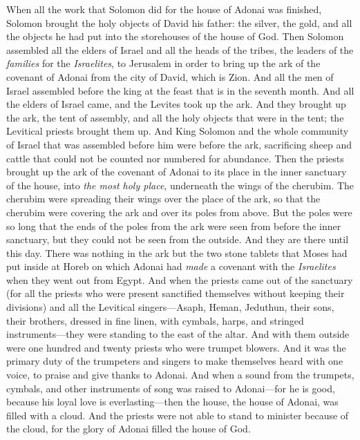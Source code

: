 \begin{biblechapter} %
 When all the work that Solomon did for the house of Adonai was finished, Solomon brought the holy objects of David his father: the silver, the gold, and all the objects he had put into the storehouses of the house of God.
\verse Then Solomon assembled all the elders of Israel and all the heads of the tribes, the leaders of the \textit{families} for the \textit{Israelites}, to Jerusalem in order to bring up the ark of the covenant of Adonai from the city of David, which is Zion.
\verse And all the men of Israel assembled before the king at the feast that is in the seventh month.
\verse And all the elders of Israel came, and the Levites took up the ark.
\verse And they brought up the ark, the tent of assembly, and all the holy objects that were in the tent; the Levitical priests brought them up.
\verse And King Solomon and the whole community of Israel that was assembled before him were before the ark, sacrificing sheep and cattle that could not be counted nor numbered for abundance.
\verse Then the priests brought up the ark of the covenant of Adonai to its place in the inner sanctuary of the house, into \textit{the most holy place}, underneath the wings of the cherubim.
\verse The cherubim were spreading their wings over the place of the ark, so that the cherubim were covering the ark and over its poles from above.
\verse But the poles were so long that the ends of the poles from the ark were seen from before the inner sanctuary, but they could not be seen from the outside. And they are there until this day.
\verse There was nothing in the ark but the two stone tablets that Moses had put inside at Horeb on which Adonai had \textit{made} a covenant with the \textit{Israelites} when they went out from Egypt.
\verse And when the priests came out of the sanctuary (for all the priests who were present sanctified themselves without keeping their divisions)
\verse and all the Levitical singers—Asaph, Heman, Jeduthun, their sons, their brothers, dressed in fine linen, with cymbals, harps, and stringed instruments—they were standing to the east of the altar. And with them outside were one hundred and twenty priests who were trumpet blowers.
\verse And it was the primary duty of the trumpeters and singers to make themselves heard with one voice, to praise and give thanks to Adonai. And when a sound from the trumpets, cymbals, and other instruments of song was raised to Adonai—for he is good, because his loyal love is everlasting—then the house, the house of Adonai, was filled with a cloud.
\verse And the priests were not able to stand to minister because of the cloud, for the glory of Adonai filled the house of God.
\end{biblechapter}

